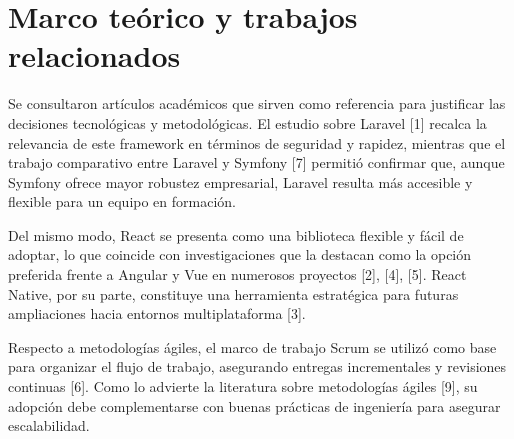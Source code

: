 \section{Marco teórico y trabajos relacionados}
Se consultaron artículos académicos que sirven como referencia para justificar las 
decisiones tecnológicas y metodológicas. El estudio sobre Laravel [1] recalca la 
relevancia de este framework en términos de seguridad y rapidez, mientras que el trabajo 
comparativo entre Laravel y Symfony [7] permitió confirmar que, aunque Symfony 
ofrece mayor robustez empresarial, Laravel resulta más accesible y flexible para un 
equipo en formación. 

Del mismo modo, React se presenta como una biblioteca flexible y fácil de adoptar, lo 
que coincide con investigaciones que la destacan como la opción preferida frente a 
Angular y Vue en numerosos proyectos [2], [4], [5]. React Native, por su parte, 
constituye una herramienta estratégica para futuras ampliaciones hacia entornos 
multiplataforma [3]. 

Respecto a metodologías ágiles, el marco de trabajo Scrum se utilizó como base para 
organizar el flujo de trabajo, asegurando entregas incrementales y revisiones continuas 
[6]. Como lo advierte la literatura sobre metodologías ágiles [9], su adopción debe 
complementarse con buenas prácticas de ingeniería para asegurar escalabilidad. 
